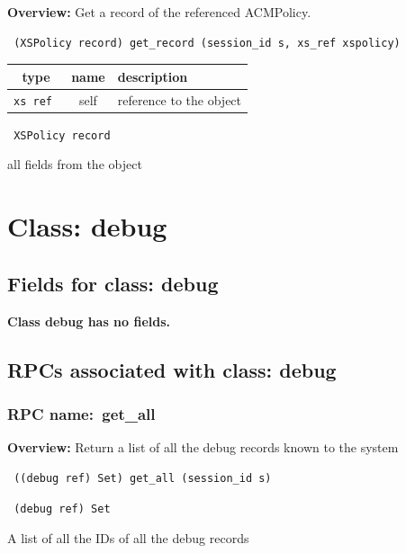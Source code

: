 {\bf Overview:}
Get a record of the referenced ACMPolicy.

\begin{verbatim} (XSPolicy record) get_record (session_id s, xs_ref xspolicy)\end{verbatim}




\vspace{0.3cm}
\begin{tabular}{|c|c|p{7cm}|}
 \hline
{\bf type} & {\bf name} & {\bf description} \\ \hline
{\tt xs ref } & self & reference to the object \\ \hline

\end{tabular}

\vspace{0.3cm}

{\tt
XSPolicy record
}


all fields from the object

\newpage
\section{Class: debug}
\subsection{Fields for class: debug}
{\bf Class debug has no fields.}
\subsection{RPCs associated with class: debug}
\subsubsection{RPC name:~get\_all}

{\bf Overview:} 
Return a list of all the debug records known to the system

\begin{verbatim} ((debug ref) Set) get_all (session_id s)\end{verbatim}


\vspace{0.3cm}

{\tt 
(debug ref) Set
}


A list of all the IDs of all the debug records
\vspace{0.3cm}
\vspace{0.3cm}
\vspace{0.3cm}
